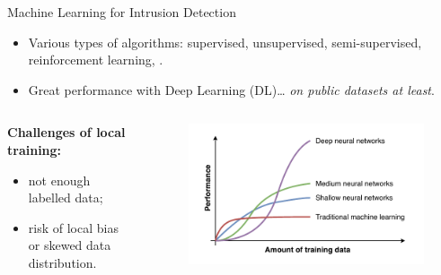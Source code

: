 \begin{frame}{Machine Learning for Intrusion Detection}
  \bigskip
  \only<+>{}%
  \begin{itemize}
    \item Various types of algorithms: \alert<+->{supervised}, unsupervised, semi-supervised, reinforcement learning, \etc.
    \item Great performance with Deep Learning (DL)\dots{}
    \onslide<+->
    \emph{on public datasets at least}.
  \end{itemize}
  \bigskip
  
  \onslide<+->
  \begin{columns}
    \begin{column}{0.4\textwidth}
        \textbf{Challenges of local training:}
        \begin{itemize}
          \item not enough labelled data;
          \item risk of local bias or skewed data distribution.
        \end{itemize}
    \end{column}

    \begin{column}{0.6\textwidth}
      \begin{figure}
        \centering
        \includegraphics[width=\linewidth]{figures/intro/ml-perf}
      \end{figure}
    \end{column}
  \end{columns}
\end{frame}

